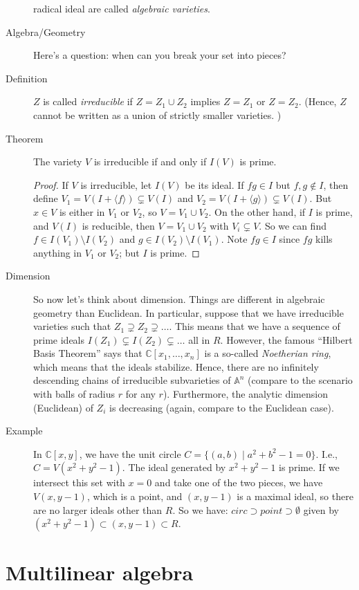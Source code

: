 \documentclass[12pt]{article}
\newcommand{\bbA}{\mathbb{A}}
\newcommand{\bbC}{\mathbb{C}}
\begin{document}
\begin{description}
  radical ideal are called \emph{algebraic varieties}. 
\item[Algebra/Geometry] Here's a question: when can you break your set
  into pieces?
\item[Definition] $Z$ is called \emph{irreducible} if $Z=Z_1\cup Z_2$
  implies $Z=Z_1$ or $Z=Z_2$. (Hence, $Z$ cannot be written as a union
  of strictly smaller varieties. )
\item[Theorem]   The variety $V$ is irreducible if and only if $I(V)$
  is prime.
  \begin{proof}
    If $V$ is irreducible, let $I(V)$ be its ideal. If $fg\in I$ but
    $f,g\notin I$, then define $V_1=V(I+\langle f\rangle)\subsetneq
    V(I)$ and $V_2=V(I+\langle g\rangle)\subsetneq V(I)$. But $x\in V$
    is either in $V_1$ or $V_2$, so $V=V_1\cup V_2$. 
On the other hand, if $I$ is prime, and $V(I)$ is reducible, then
$V=V_1\cup V_2$ with $V_i\subsetneq V$. So we can find $f\in
I(V_1)\setminus I(V_2)$ and $g\in I(V_2)\setminus I(V_1)$. Note $fg\in
I$ since $fg$ kills anything in $V_1$ or $V_2$; but $I$ is prime. 
  \end{proof}
\item[Dimension] So now let's think about dimension. Things are
  different in algebraic geometry than Euclidean. In particular,
  suppose that we have irreducible varieties such that $Z_1\supsetneq
  Z_2 \supsetneq \dotsc$. This means that we have a sequence of prime
  ideals $I(Z_1)\subsetneq I(Z_2) \subsetneq \dotsc$ all in
  $R$. However, the famous ``Hilbert Basis Theorem'' says that
  $\bbC[x_1,\dotsc, x_n]$ is a so-called \emph{Noetherian ring}, which
  means that the ideals stabilize. Hence, there are no infinitely
  descending chains of irreducible subvarieties of $\bbA^n$ (compare
  to the scenario with balls of radius $r$ for any $r$). Furthermore,
  the analytic dimension (Euclidean) of $Z_i$ is decreasing (again,
  compare to the Euclidean case). 
\item[Example] In $\bbC[x,y]$, we have the unit circle $C=\{(a,b) \mid
  a^2+b^2-1=0\}$. I.e., $C=V(x^2+y^2-1)$. The ideal generated by
  $x^2+y^2-1$ is prime. If we intersect this set with $x=0$ and take
  one of the two pieces, we have $V(x,y-1)$, which is a point, and
  $(x,y-1)$ is a maximal ideal, so there are no larger ideals other
  than $R$. So we have: $circ\supset point \supset \emptyset$ given by
  $(x^2+y^2-1)\subset (x,y-1) \subset R$. 
\end{description}


\section{Multilinear algebra}
\label{sec:multilinear-algebra}
\end{document}
